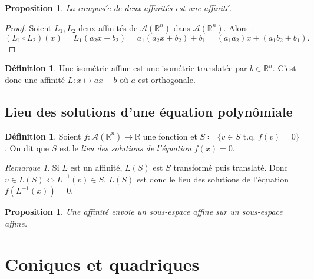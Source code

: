 \documentclass{article}
\newcommand{\R}{\mathbb R}
\newcommand{\tq}{\textrm{ t.q. }}
\newtheorem{prp}[thm]{Proposition}
\theoremstyle{definition}
\newtheorem{déf}[thm]{Définition}
\theoremstyle{remark}
\newtheorem*{rmq}{Remarque}
\begin{document}
		\begin{prp} La composée de deux affinités est une affinité.
		\end{prp}

		\begin{proof} Soient $L_1, L_2$ deux affinités de $\mathcal A(\R^n)$ dans $\mathcal A(\R^n)$. Alors~:
		\[(L_1 \circ L_2)(x) = L_1(a_2x + b_2) = a_1(a_2x + b_2) + b_1 = (a_1a_2)x + \left(a_1b_2 + b_1\right).\]
		\end{proof}

		\begin{déf} Une isométrie affine est une isométrie translatée par $b \in \R^n$. C'est donc une affinité $L : x \mapsto ax + b$ où $a$ est orthogonale.
		\end{déf}

	\subsection{Lieu des solutions d'une équation polynômiale}
		\begin{déf} Soient $f : \mathcal A(\R^n) \to \R$ une fonction et $S \coloneqq \{v \in S \tq f(v) = 0\}$. On dit que $S$ est le \emph{lieu des solutions
		de l'équation $f(x) = 0$}.
		\end{déf}

		\begin{rmq} Si $L$ est un affinité, $L(S)$ est $S$ transformé puis translaté. Donc $v \in L(S) \iff L^{-1}(v) \in S$. $L(S)$ est donc le lieu des solutions
		de l'équation $f(L^{-1}(x)) = 0$.
		\end{rmq}

		\begin{prp} Une affinité envoie un sous-espace affine sur un sous-espace affine.
		\end{prp}

\newpage
\section{Coniques et quadriques}
\end{document}
